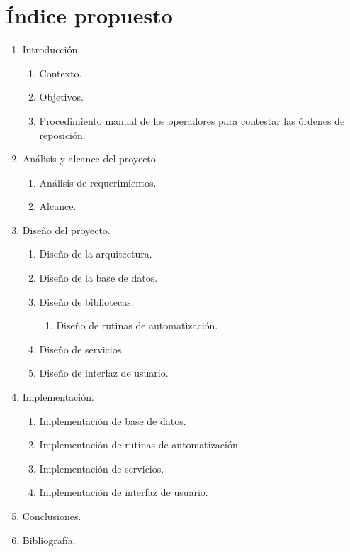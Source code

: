 \documentclass[letterpaper,11pt]{article}
\begin{document}
\section{Índice propuesto}
\renewcommand{\labelenumii}{\arabic{enumi}.\arabic{enumii}.}
\renewcommand{\labelenumiii}{\arabic{enumi}.\arabic{enumii}.\arabic{enumiii}.}
\begin{enumerate}
  \item Introducción.
  \begin{enumerate}
    \item Contexto.
    \item Objetivos.
    \item Procedimiento manual de los operadores para contestar las órdenes de reposición.
  \end{enumerate}
  \item Análisis y alcance del proyecto.
  \begin{enumerate}
    \item Análisis de requerimientos.
    \item Alcance.
  \end{enumerate}
\item Diseño del proyecto.
\begin{enumerate}
  \item Diseño de la arquitectura.
  \item Diseño de la base de datos.
  \item Diseño de bibliotecas.
  \begin{enumerate}
    \item Diseño de rutinas de automatización.
  \end{enumerate}
  \item Diseño de servicios.
  \item Diseño de interfaz de usuario.
\end{enumerate}
\item Implementación.
\begin{enumerate}
  \item Implementación de base de datos.
  \item Implementación de rutinas de automatización.
  \item Implementación de servicios.
  \item Implementación de interfaz de usuario.
\end{enumerate}
\item Conclusiones.
\item Bibliografía.
\end{enumerate}
\end{document}
